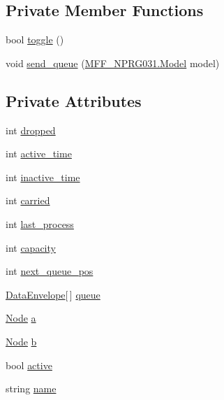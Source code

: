 \subsection*{Private Member Functions}
\begin{DoxyCompactItemize}
\item 
bool \hyperlink{classNetTrafficSimulator_1_1Link_a06d3c8e29b67ae95c9d854c97cf48d1e}{toggle} ()
\item 
void \hyperlink{classNetTrafficSimulator_1_1Link_a4ca4f2df795e1a3e814af806a176789d}{send\-\_\-queue} (\hyperlink{classMFF__NPRG031_1_1Model}{M\-F\-F\-\_\-\-N\-P\-R\-G031.\-Model} model)
\end{DoxyCompactItemize}
\subsection*{Private Attributes}
\begin{DoxyCompactItemize}
\item 
int \hyperlink{classNetTrafficSimulator_1_1Link_a0374f1c17ad827ae00d53d41b1893a9e}{dropped}
\item 
int \hyperlink{classNetTrafficSimulator_1_1Link_a9c09033d252b42f62a3857397c06e320}{active\-\_\-time}
\item 
int \hyperlink{classNetTrafficSimulator_1_1Link_a2359ef316a04da7a0170827792a8b703}{inactive\-\_\-time}
\item 
int \hyperlink{classNetTrafficSimulator_1_1Link_ada7cc15d14a2c0d9111e91a96656e973}{carried}
\item 
int \hyperlink{classNetTrafficSimulator_1_1Link_a1b4280184e08f88565060c4786d5033b}{last\-\_\-process}
\item 
int \hyperlink{classNetTrafficSimulator_1_1Link_a24a004105c985c4e5ee64e4c839b1915}{capacity}
\item 
int \hyperlink{classNetTrafficSimulator_1_1Link_ae9f28a316a491bf4823314f5f794484a}{next\-\_\-queue\-\_\-pos}
\item 
\hyperlink{classNetTrafficSimulator_1_1Link_1_1DataEnvelope}{Data\-Envelope}\mbox{[}$\,$\mbox{]} \hyperlink{classNetTrafficSimulator_1_1Link_a0a9c8700a5fe5e22d7091587319886aa}{queue}
\item 
\hyperlink{classNetTrafficSimulator_1_1Node}{Node} \hyperlink{classNetTrafficSimulator_1_1Link_a4b7875d945423d1f64c31d8156a3308d}{a}
\item 
\hyperlink{classNetTrafficSimulator_1_1Node}{Node} \hyperlink{classNetTrafficSimulator_1_1Link_af85461b8b8d35adb1d8fc80849c0717d}{b}
\item 
bool \hyperlink{classNetTrafficSimulator_1_1Link_a1026cabe177ffe17054699706dea1452}{active}
\item 
string \hyperlink{classNetTrafficSimulator_1_1Link_af5a2835b585c255fbc6584f2f5388be8}{name}
\end{DoxyCompactItemize}


